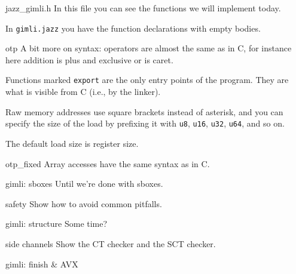 \documentclass[
  xcolor={table,dvipsnames},
]{beamer}
\begin{document}
\begin{frame}{jazz\_gimli.h}
  In this file you can see the functions we will implement today.

  In \texttt{gimli.jazz} you have the function declarations with empty bodies.
\end{frame}

\begin{frame}{otp}
  A bit more on syntax: operators are almost the same as in C, for instance here
  addition is plus and exclusive or is caret.

  \vfill

  Functions marked \texttt{export} are the only entry points of the program.
  They are what is visible from C (i.e., by the linker).

  \vfill

  Raw memory addresses use square brackets instead of asterisk, and you can
  specify the size of the load by prefixing it
  with \texttt{u8}, \texttt{u16}, \texttt{u32}, \texttt{u64}, and so on.

  The default load size is register size.
\end{frame}

\begin{frame}{otp\_fixed}
  Array accesses have the same syntax as in C.
\end{frame}

\begin{frame}{gimli: sboxes}
  Until we're done with sboxes.
\end{frame}

\begin{frame}{safety}
  Show how to avoid common pitfalls.
\end{frame}

\begin{frame}{gimli: structure}
  Some time?
\end{frame}

\begin{frame}{side channels}
  Show the CT checker and the SCT checker.
\end{frame}

\begin{frame}{gimli: finish \& AVX}
\end{frame}
\end{document}
